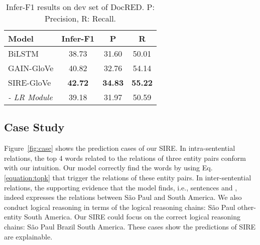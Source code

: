 \documentclass[11pt,a4paper]{article}
\begin{document}
\begin{table}
\centering
\begin{tabular}{lccc}
\hline
Model & Infer-F1 & P & R \\
\hline
BiLSTM & 38.73 & 31.60 & 50.01 \\
GAIN-GloVe & 40.82  & 32.76 & 54.14 \\
\hline
SIRE-GloVe & \textbf{42.72}  & \textbf{34.83} & \textbf{55.22}\\
\textit{- LR Module} & 39.18 & 31.97 & 50.59\\
\hline
\end{tabular}
\caption{Infer-F1 results on dev set of DocRED. P: Precision, R: Recall.}
\label{table:infer}
\end{table}

\subsection{Case Study\label{ssec:case-study}}

Figure~\ref{fig:case} shows the prediction cases of our SIRE. In intra-sentential relations, the top 4 words related to the relations of three entity pairs conform with our intuition. Our model correctly find the words by using Eq.\ref{equation:topk} that trigger the relations of these entity pairs. In inter-sentential relations, the supporting evidence that the model finds, i.e., sentences  and , indeed expresses the relations between São Paul and South America. We also conduct logical reasoning in terms of the logical reasoning chains: São Paul other-entity  South America. Our SIRE could focus on the correct logical reasoning chains: São Paul Brazil  South America. These cases show the predictions of SIRE are explainable.
\end{document}
